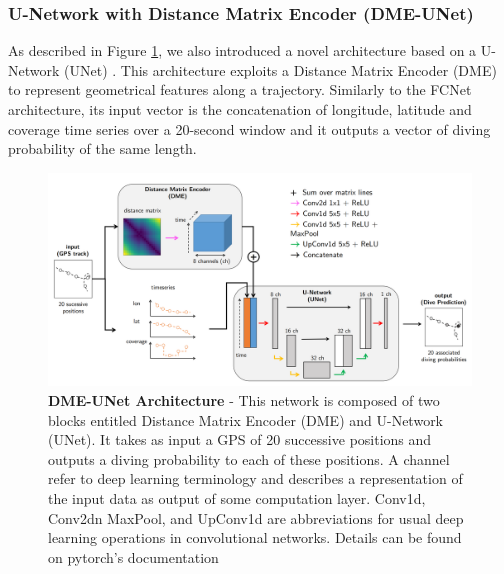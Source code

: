 \documentclass{article}
\begin{document}
\subsubsection{U-Network with Distance Matrix Encoder (DME-UNet)}
As described in Figure \ref{figure3}, we also introduced a novel architecture based on a U-Network (UNet)  \cite{ronneberger_u-net_2015}. This architecture exploits a
Distance Matrix Encoder (DME) to represent geometrical features along a trajectory.
Similarly to the FCNet architecture, its input vector is the concatenation of longitude, latitude and coverage time series over a 20-second window and it outputs a vector of diving probability of the same length.

\begin{figure}[!h]
  \hspace*{-2cm}
  \includegraphics[scale=0.45]{figure3.png}
  \caption{\textbf{DME-UNet Architecture} - This network is composed of two blocks entitled Distance Matrix Encoder (DME) and U-Network (UNet). It takes as input a GPS of 20 successive positions and outputs a diving probability to each of these positions. A channel refer to deep learning terminology and describes a representation of the input data as output of some computation layer. Conv1d, Conv2dn MaxPool, and UpConv1d are abbreviations for usual deep learning operations in convolutional networks. Details can be found on pytorch's documentation \cite{paskze_pytorch_2019} }
  \label{figure3}
\end{figure}
\end{document}
